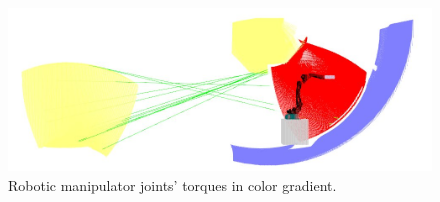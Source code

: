 \begin{figure}
	\centering
	\includegraphics[width=.95\columnwidth]{figs/results/sim_mh12_sp}
    \caption{Robotic manipulator joints' torques in color gradient.}
    \label{fig:calibration}
\end{figure}